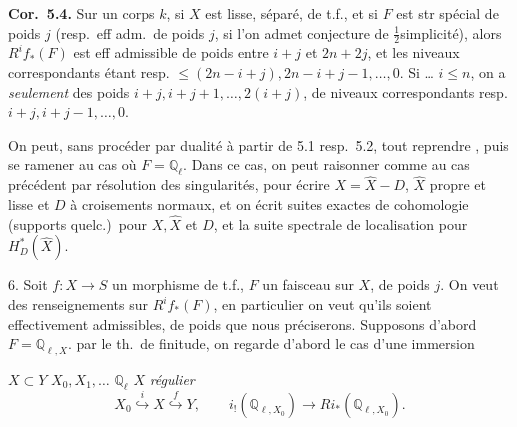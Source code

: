 \documentclass[11pt,a4paper]{article}
\begin{document}
\textbf{Cor.\ 5.4.} Sur un corps $k$, si $X$ est lisse, séparé, de t.f., et si
$F$ est \struck{\ill{}} str spécial de poids $j$ (resp.\ eff
adm.\ de poids $j$, si l'on admet conjecture de $\tfrac{1}{2}$simplicité),
alors $R^{i}f_{*}(F)$ est \struck{\ill{}} eff admissible de poids entre
$i+j$ et $2n+2j$, et les niveaux correspondants étant resp.
$\leqslant (2n-i+j), 2n-i+j-1, \ldots, 0$. Si … $i \leqslant n$, on a
 \emph{seulement} des poids $i+j, i+j+1, \ldots, 2(i+j)$,
 de niveaux correspondants resp.
$i+j, i+j-1, \ldots, 0$.

On peut, sans procéder par dualité à partir de 5.1 resp.\ 5.2,  tout reprendre , puis se ramener
 au cas où
$F = \mathbb{Q}_{\ell}$. Dans ce cas, on peut raisonner comme au cas
précédent par  résolution des singularités, pour
écrire $X = \widehat{X} - D$, $\widehat{X}$  propre
et lisse et $D$  à croisements normaux, et on écrit suites
exactes de cohomologie  (supports quelc.)\ pour
$X, \widehat{X}$ et $D$, et la suite spectrale de localisation pour
$H^{*}_{D}(\widehat{X})$.

6. Soit $f : X \to S$ un morphisme de t.f., $F$ un faisceau
  sur $X$, de poids
$j$. On veut des renseignements sur  $R^{i}f_{*}(F)$, en
particulier on veut qu'ils soient effectivement admissibles, de poids que
nous préciserons. Supposons d'abord $F = \mathbb{Q}_{\ell,X}$.
 par le th.\ de finitude, on regarde d'abord le cas d'une
immersion


$X \subset Y$ \qquad $X_{0}, X_{1}, \ldots$ \qquad {}
\qquad $\mathbb{Q}_{\ell}$ \qquad $X$ \emph{régulier}
\[
X_{0} \overset{i}{\hookrightarrow} X \overset{f}{\hookrightarrow} Y, \qquad
i_{!}(\mathbb{Q}_{\ell,X_{0}}) \to Ri_{*}(\mathbb{Q}_{\ell,X_{0}}) .
\]
\end{document}
